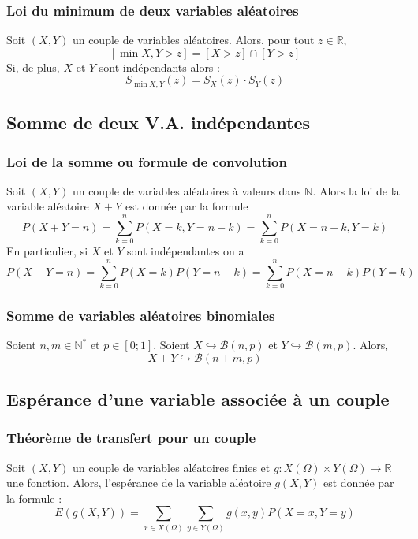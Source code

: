         \subsubsection{Loi du minimum de deux variables aléatoires}
            Soit $(X, Y)$ un couple de variables aléatoires. Alors, pour tout $z \in \mathbb{R}$,
            \[
                [\min{X,Y} > z] = [X > z] \cap [Y > z] 
            \]
            Si, de plus, $X$ et $Y$ sont indépendants alors :
            \[
                S_{\min{X,Y}}(z) = S_X(z) \cdot S_Y(z) 
            \]

    \subsection{Somme de deux V.A. indépendantes}
        \subsubsection{Loi de la somme ou formule de convolution}
            Soit $(X, Y)$ un couple de variables aléatoires à valeurs dans $\mathbb{N}$.
            Alors la loi de la variable aléatoire $X + Y$ est donnée par la formule
            \[
                P(X + Y = n) = \sum_{k = 0}^{n} P(X = k, Y = n - k) = \sum_{k = 0}^{n} P(X = n - k, Y = k)
            \]
            En particulier, si $X$ et $Y$ sont indépendantes on a 
            \[
                P(X + Y = n) = \sum_{k = 0}^{n} P(X = k)P(Y = n - k) = \sum_{k = 0}^{n} P(X = n - k)P(Y = k)
            \]

        \subsubsection{Somme de variables aléatoires binomiales}
            Soient $n, m \in \mathbb{N}^{*}$ et $p \in [0;1]$.
            Soient $X \hookrightarrow \mathcal{B}(n, p)$ et $Y \hookrightarrow \mathcal{B}(m, p)$. Alors,
            \[
                X + Y \hookrightarrow \mathcal{B}(n + m, p)
            \]

    \subsection{Espérance d'une variable associée à un couple}
        \subsubsection{Théorème de transfert pour un couple}
            Soit $(X, Y)$ un couple de variables aléatoires finies et $g : X(\Omega) \times Y(\Omega) \rightarrow \mathbb{R}$ une fonction.
            Alors, l'espérance de la variable aléatoire $g(X, Y)$ est donnée par la formule : 
            \[
                E(g(X, Y)) = \sum_{x \in X(\Omega)} \sum_{y \in Y(\Omega)} g(x, y)P(X = x, Y = y)
            \]

